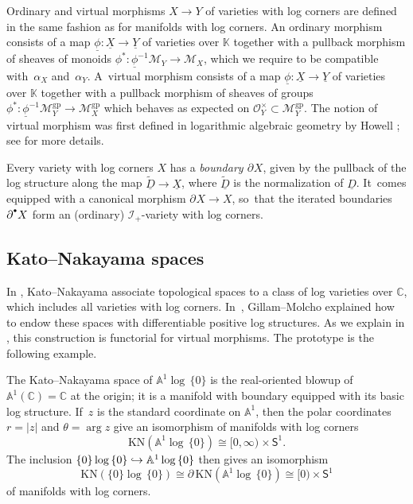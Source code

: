 \documentclass[JEP,XML,SOM,Unicode,NoFloatCountersInSection,published]{cedram}
\let\oldbullet\bullet
\renewcommand{\bullet}{{\raisebox{1pt}{$\scriptscriptstyle\oldbullet$}}}
\newcommand\hto{\mathrel{\lhook\joinrel\to}}
\theoremstyle{definition}
\theoremstyle{remark}
\newenvironment{example}
  {\pushQED{\qed}\renewcommand{\qedsymbol}{$\lozenge$}\examplex}
  {\popQED\endexamplex}
\let\defn\emph
\newcommand{\CC}{\mathbb{C}}
\newcommand{\KK}{\mathbb{K}}
\newcommand{\AF}{\mathbb{A}}
\newcommand{\halfspc}[1]{[0,\infty)^{#1}}
\newcommand{\logcyl}{\AF^1 \log\, \{0\}}
\newcommand{\logcirc}{\{0\} \log\, \{0\}}
\newcommand{\cO}[1]{\mathcal{O}_{#1}}
\newcommand{\cOx}[1]{\cO{#1}^\times}
\newcommand{\cM}{\mathscr{M}}
\newcommand{\cMgp}{\mathscr{M}^{\mathrm{gp}}}
\newcommand{\uphi}{\underline{\phi}}
\newcommand{\bdX}[1][]{\partial^{#1} X}
\newcommand{\uX}{\underline{X}}
\newcommand{\uY}{\underline{Y}}
\newcommand{\uD}{\underline{D}}
\newcommand{\KN}[1]{\mathrm{KN}(#1)}
\newcommand{\unitcirc}{\mathsf{S}^{1}}
\newcommand{\ascat}{\mathscr{I}_+}
\begin{document}
Ordinary and virtual morphisms $X \to Y$ of varieties with log corners are defined in the same fashion as for manifolds with log corners. An ordinary morphism consists of a map $\uphi \colon \uX \to \uY$ of varieties over $\KK$ together with a pullback morphism of sheaves of monoids $\phi^* : \uphi^{-1}\cM_{Y} \to \cM_X$, which we require to be compatible with~$\alpha_X$ and~$\alpha_Y$. A~virtual morphism consists of a map $\uphi\colon \uX\to \uY$ of varieties over $\KK$ together with a pullback morphism of sheaves of groups $\phi^*\colon \uphi^{-1}\cMgp_Y\to \cMgp_X$ which behaves as expected on $\cOx{Y} \subset \cMgp_Y$. The notion of virtual morphism was first defined in logarithmic algebraic geometry by Howell \cite{Howell2017}; see \cite{DPP:WeakMorphisms} for more details.

Every variety with log corners $X$ has a \defn{boundary $\bdX$}, given by the pullback of the log structure along the map $\widetilde{\uD} \to\uX$, where $\widetilde{\uD}$ is the normalization of $\uD$. It~comes equipped with a canonical morphism $\bdX \to X$, so~that the iterated boundaries $\bdX[\bullet]$ form an (ordinary) $\ascat$-variety with log corners.

\subsection{Kato--Nakayama spaces}\label{sec:KN}

In \cite{KatoNakayama}, Kato--Nakayama associate topological spaces to a class of log varieties over $\CC$, which includes all varieties with log corners. In~\cite{GillamMolcho}, Gillam--Molcho explained how to endow these spaces with differentiable positive log structures. As we explain in \cite{DPP:WeakMorphisms}, this construction is functorial for virtual morphisms. The prototype is the following example.

\begin{example}
The Kato--Nakayama space of $\logcyl$ is the real-oriented blowup of $\AF^1(\CC) = \CC$ at the origin; it is a manifold with boundary equipped with its basic log structure. If~$z$ is the standard coordinate on $\AF^1$, then the polar coordinates $r = |z|$ and $\theta = \arg z$ give an isomorphism of manifolds with log corners
\[
\KN{\logcyl} \cong \halfspc{} \times \unitcirc.
\]
The inclusion $\logcirc \hto \logcyl$ then gives an isomorphism
\[
\KN{\logcirc} \cong \partial\, \KN{\logcyl} \cong [0) \times \unitcirc
\]
of manifolds with log corners.
\end{example}
\end{document}
